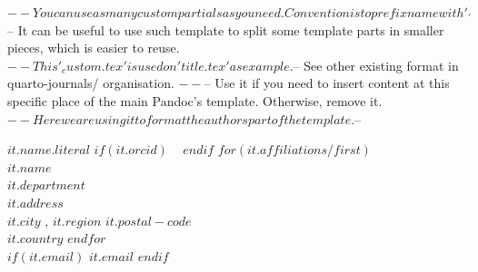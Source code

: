 $-- You can use as many custom partials as you need. Convention is to prefix name with '_'
$-- It can be useful to use such template to split some template parts in smaller pieces, which is easier to reuse. 
$-- This '_custom.tex' is used on 'title.tex' as example.
$-- See other existing format in quarto-journals/ organisation.
$-- %
$-- Use it if you need to insert content at this specific place of the main Pandoc's template. Otherwise, remove it.
$-- Here we are using it to format the authors part of the template.
$-- %

$it.name.literal$
$if(it.orcid)$
~
$endif$
$for(it.affiliations/first)$
\\$it.name$
\\$it.department$
\\$it.address$
\\$it.city$ , \hspace{1pt} $it.region$ \hspace{1pt} $it.postal-code$
\\$it.country$
$endfor$
\\$if(it.email)$
\href{mailto:$it.email$}{$it.email$}
$endif$
